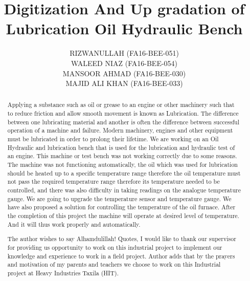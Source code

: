 \documentclass[14pt]{report}
\begin{document}
\begin{titlepage}

\title{\Huge\textbf{Digitization And Up gradation of
Lubrication Oil Hydraulic Bench}}

\author{RIZWANULLAH (FA16-BEE-051)\\WALEED NIAZ (FA16-BEE-054)\\MANSOOR AHMAD (FA16-BEE-030)\\MAJID ALI KHAN (FA16-BEE-033)}

\end{titlepage}
\maketitle

\begin{abstract}
  Applying a substance such as oil or grease to an engine or other machinery such that to reduce friction and allow smooth movement is known as Lubrication. The difference between one lubricating material and another is often the difference between successful operation of a machine and failure. Modern machinery, engines and other equipment must be lubricated in order to prolong their lifetime. We are working on an Oil Hydraulic and lubrication bench that is used for the lubrication and hydraulic test of an engine. This machine or test bench was not working correctly due to some reasons. The machine was not functioning automatically, the oil which was used for lubrication should be heated up to a specific temperature range therefore the oil temperature must not pass the required temperature range therefore its temperature needed to be controlled, and there was also difficulty in taking readings on the analogue temperature gauge. We are going to upgrade the temperature sensor and temperature gauge. We have also proposed a solution for controlling the temperature of the oil furnace. After the completion of this project the machine will operate at desired level of temperature. And it will thus work properly and automatically.
\end{abstract}

\renewcommand{\abstractname}{Acknowledgement}

\begin{abstract}
The author wishes to say Alhamdulillah! Quotes, I would like to thank our supervisor for providing us
opportunity to work on this industrial project to implement our knowledge and experience to work in a
ﬁeld project. Author adds that by the prayers and motivation of my parents and teachers we choose to
work on this Industrial project at Heavy Industries Taxila (HIT).

\end{abstract}
\end{document}

